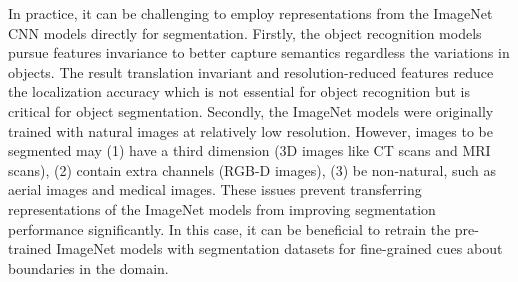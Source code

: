 

In practice, it can be challenging to employ representations from the ImageNet CNN models directly for segmentation.
Firstly, the object recognition models pursue features invariance to better capture semantics regardless the variations in objects.
The result translation invariant and resolution-reduced features reduce the localization accuracy which is not essential for object recognition but is critical for object segmentation. \cite{zheng2015conditional,chen2016deeplab}
Secondly, the ImageNet models were originally trained with natural images at relatively low resolution.
However, images to be segmented may (1) have a third dimension (3D images like CT scans and MRI scans), (2) contain extra channels (RGB-D images),  (3) be non-natural, such as aerial images and medical images.
These issues prevent transferring representations of the ImageNet models from improving segmentation performance significantly.
In this case, it can be beneficial to retrain the pre-trained ImageNet models with segmentation datasets for fine-grained cues about boundaries in the domain.




